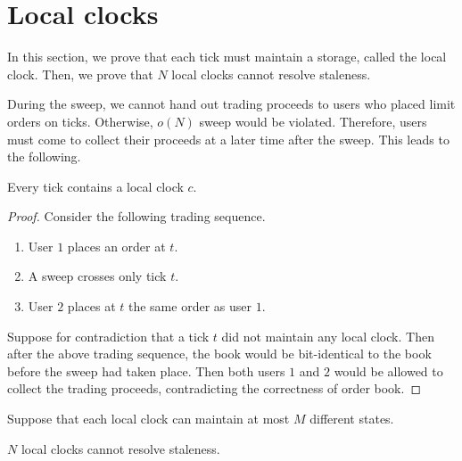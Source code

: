 \section{Local clocks} \label{sec:local}
In this section, we prove that each tick must maintain a storage, called the local clock. Then, we prove that $N$ local clocks cannot resolve staleness.

During the sweep, we cannot hand out trading proceeds to users who placed limit orders on ticks. Otherwise, $o(N)$ sweep would be violated. Therefore, users must come to collect their proceeds at a later time after the sweep. This leads to the following.
\begin{proposition} \label{proposition:local}
    Every tick contains a local clock $c$.
\end{proposition}
\begin{proof}
    Consider the following trading sequence.
    \begin{enumerate}
        \item User $1$ places an order at $t$.
        \item A sweep crosses only tick $t$.
        \item User $2$ places at $t$ the same order as user $1$.
    \end{enumerate}
    Suppose for contradiction that a tick $t$ did not maintain any local clock. Then after the above trading sequence, the book would be bit-identical to the book before the sweep had taken place. Then both users $1$ and $2$ would be allowed to collect the trading proceeds, contradicting the correctness of order book.
\end{proof}
Suppose that each local clock can maintain at most $M$ different states.
\begin{theorem} \label{thm:insufficient}
    $N$ local clocks cannot resolve staleness.
\end{theorem}
